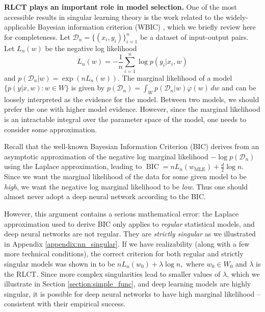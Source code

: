 \documentclass{article} %
\begin{document}
\textbf{RLCT plays an important role in model selection.}
One of the most accessible results in singular learning theory is the work related to the widely-applicable Bayesian information criterion (WBIC) \citet{watanabe_widely_2013}, which we briefly review here for completeness.
Let $\mathcal D_n =  \{(x_i,y_i)\}_{i=1}^n$ be a dataset of input-output pairs.  
Let $L_n(w)$ be the negative log likelihood
\begin{equation}
L_n(w) = -\frac{1}{n} \sum_{i=1}^n \log p(y_i |x_i, w)
\label{eq:nll}
\end{equation}
and $p(\mathcal D_n | w) = \exp( n L_n(w)).$
The marginal likelihood of a model $\{p(y|x,w): w \in W\}$ is given by
$
p(\mathcal D_n) = \int_W p(\mathcal D_n|w) \varphi(w) \,dw
$
and can be loosely interpreted as the evidence for the model. Between two models, we should prefer the one with higher model evidence. However, since the marginal likelihood is an intractable integral over the parameter space of the model, one needs to consider some approximation.

Recall that the well-known Bayesian Information Criterion (BIC) derives from an asymptotic approximation of the negative log marginal likelihood $-\log p(\mathcal D_n)$ using the Laplace approximation, leading to
$
\operatorname{BIC} = nL_n( w_{\operatorname{MLE}}) + \frac{d}{2} \log n.
$
Since we want the marginal likelihood of the data for some given model to be \textit{high}, we want the negative log marginal likelihood to be \textit{low}. Thus one should almost never adopt a deep neural network according to the BIC. 

However, this argument contains a serious mathematical error: the Laplace approximation used to derive BIC only applies to \emph{regular} statistical models, and deep neural networks are not regular. They are \textit{strictly singular} as we illustrated in Appendix \ref{appendix:nn_singular}. 
If we have realizability (along with a few more technical conditions), the correct criterion for both regular and strictly singular models was shown in \citet{watanabe_widely_2013} to be 
$
nL_n(w_0) + \lambda \log n,
$
where $w_0 \in W_0$ and $\lambda$ is the RLCT. 
Since more complex singularities lead to smaller values of $\lambda$, which we illustrate in Section \ref{section:simple_func}, and deep learning models are highly singular, it is possible for deep neural networks to have high marginal likelihood -- consistent with their empirical success. 
\end{document}
